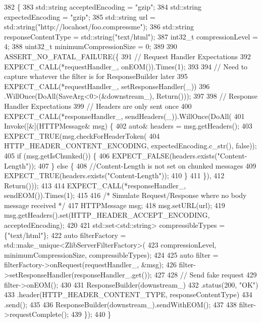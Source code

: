 \begin{DoxyCode}
382                                             \{
383   std::string acceptedEncoding = \textcolor{stringliteral}{"gzip"};
384   std::string expectedEncoding = \textcolor{stringliteral}{"gzip"};
385   std::string url = std::string(\textcolor{stringliteral}{"http://locahost/foo.compressme"});
386   std::string responseContentType = std::string(\textcolor{stringliteral}{"text/html"});
387   int32\_t compressionLevel = 4;
388   uint32\_t minimumCompressionSize = 0;
389 
390   ASSERT\_NO\_FATAL\_FAILURE(\{
391     \textcolor{comment}{// Request Handler Expectations}
392     EXPECT\_CALL(*requestHandler\_, onEOM()).Times(1);
393 
394     \textcolor{comment}{// Need to capture whatever the filter is for ResponseBuilder later}
395     EXPECT\_CALL(*requestHandler\_, setResponseHandler(\_))
396         .WillOnce(DoAll(SaveArg<0>(&downstream\_), Return()));
397 
398     \textcolor{comment}{// Response Handler Expectations}
399     \textcolor{comment}{// Headers are only sent once}
400     EXPECT\_CALL(*responseHandler\_, sendHeaders(\_)).WillOnce(DoAll(
401         Invoke([&](HTTPMessage& msg) \{
402           \textcolor{keyword}{auto}& headers = msg.getHeaders();
403           EXPECT\_TRUE(msg.checkForHeaderToken(
404             HTTP\_HEADER\_CONTENT\_ENCODING, expectedEncoding.c\_str(), \textcolor{keyword}{false}));
405           \textcolor{keywordflow}{if} (msg.getIsChunked()) \{
406             EXPECT\_FALSE(headers.exists(\textcolor{stringliteral}{"Content-Length"}));
407           \} \textcolor{keywordflow}{else} \{
408             \textcolor{comment}{//Content-Length is not set on chunked messages}
409             EXPECT\_TRUE(headers.exists(\textcolor{stringliteral}{"Content-Length"}));
410           \}
411         \}),
412         Return()));
413 
414     EXPECT\_CALL(*responseHandler\_, sendEOM()).Times(1);
415 
416     \textcolor{comment}{/* Simulate Request/Response where no body message received */}
417     HTTPMessage msg;
418     msg.setURL(url);
419     msg.getHeaders().set(HTTP\_HEADER\_ACCEPT\_ENCODING, acceptedEncoding);
420 
421     std::set<std::string> compressibleTypes = \{\textcolor{stringliteral}{"text/html"}\};
422     \textcolor{keyword}{auto} filterFactory = std::make\_unique<ZlibServerFilterFactory>(
423         compressionLevel, minimumCompressionSize, compressibleTypes);
424 
425     \textcolor{keyword}{auto} filter = filterFactory->onRequest(requestHandler\_, &msg);
426     filter->setResponseHandler(responseHandler\_.get());
427 
428     \textcolor{comment}{// Send fake request}
429     filter->onEOM();
430 
431     ResponseBuilder(downstream\_)
432       .status(200, \textcolor{stringliteral}{"OK"})
433       .header(HTTP\_HEADER\_CONTENT\_TYPE, responseContentType)
434       .send();
435 
436     ResponseBuilder(downstream\_).sendWithEOM();
437 
438     filter->requestComplete();
439   \});
440 \}
\end{DoxyCode}
